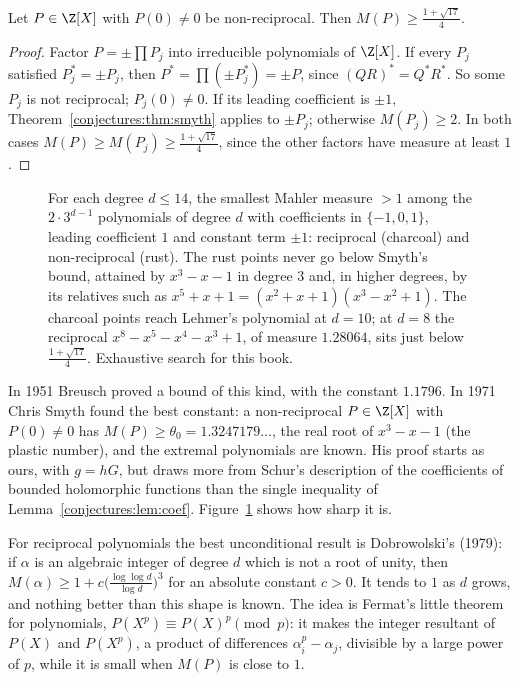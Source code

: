 \begin{corollary}\label{conjectures:cor:nonrec}
Let $P\in\Z[X]$ with $P(0)\ne0$ be non-reciprocal. Then $M(P)\ge\frac{1+\sqrt{17}}4$.
\end{corollary}
\begin{proof}
Factor $P=\pm\prod P_j$ into irreducible polynomials of $\Z[X]$. If every $P_j$ satisfied $P_j^*=\pm P_j$, then $P^*=\prod(\pm P_j^*)=\pm P$, since
$(QR)^*=Q^*R^*$. So some $P_j$ is not reciprocal; $P_j(0)\ne0$. If its leading coefficient is $\pm1$, Theorem~\ref{conjectures:thm:smyth} applies to $\pm P_j$; otherwise
$M(P_j)\ge2$. In both cases $M(P)\ge M(P_j)\ge\frac{1+\sqrt{17}}4$, since the other factors have measure at least $1$.
\end{proof}

\begin{figure}[ht]
\centering
{}
\caption{For each degree $d\le14$, the smallest Mahler measure $>1$ among the $2\cdot3^{d-1}$ polynomials of degree $d$ with coefficients in
$\{-1,0,1\}$, leading coefficient $1$ and constant term $\pm1$: reciprocal (charcoal) and non-reciprocal (rust). The rust points never go below Smyth's bound,
attained by $x^3-x-1$ in degree $3$ and, in higher degrees, by its relatives such as $x^5+x+1=(x^2+x+1)(x^3-x^2+1)$. The charcoal points reach Lehmer's polynomial at $d=10$; at $d=8$ the reciprocal
$x^8-x^5-x^4-x^3+1$, of measure $1.28064$, sits just below $\frac{1+\sqrt{17}}4$. Exhaustive search for this book.}
\label{conjectures:fig:mahler}
\end{figure}

\begin{remark}\label{conjectures:rem:smythsharp}
In 1951 Breusch proved a bound of this kind, with the constant $1.1796$. In 1971 Chris Smyth found the best constant: a non-reciprocal $P\in\Z[X]$ with $P(0)\ne0$
has $M(P)\ge\theta_0=1.3247179\ldots$, the real root of $x^3-x-1$ (the plastic number), and the extremal polynomials are known. His proof starts as ours,
with $g=hG$, but draws more from Schur's description of the coefficients of bounded holomorphic functions than the single inequality of
Lemma~\ref{conjectures:lem:coef}. Figure~\ref{conjectures:fig:mahler} shows how sharp it is.
\end{remark}

\begin{remark}\label{conjectures:rem:dobrowolski}
For reciprocal polynomials the best unconditional result is Dobrowolski's (1979): if $\alpha$ is an algebraic integer of degree $d$ which is not a root of
unity, then $M(\alpha)\ge1+c\bigl(\frac{\log\log d}{\log d}\bigr)^3$ for an absolute constant $c>0$. It tends to $1$ as $d$ grows, and nothing better than
this shape is known. The idea is Fermat's little theorem for polynomials, $P(X^p)\equiv P(X)^p\pmod p$: it makes the integer resultant of $P(X)$ and $P(X^p)$,
a product of differences $\alpha_i^p-\alpha_j$, divisible by a large power of $p$, while it is small when $M(P)$ is close to $1$.
\end{remark}

